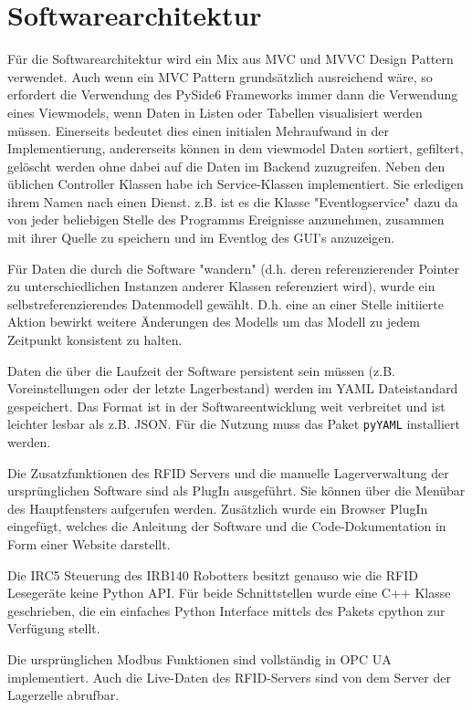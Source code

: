 \chapter{Softwarearchitektur}\label{Softwarearchitektur}

Für die Softwarearchitektur wird ein Mix aus MVC und MVVC Design Pattern verwendet. 
Auch wenn ein MVC Pattern grundsätzlich ausreichend wäre, so erfordert die Verwendung des PySide6 Frameworks immer 
dann die Verwendung eines Viewmodels, wenn Daten in Listen oder Tabellen visualisiert werden müssen. 
Einerseits bedeutet dies einen initialen Mehraufwand in der Implementierung, andererseits können in dem viewmodel 
Daten sortiert, gefiltert, gelöscht werden ohne dabei auf die Daten im Backend zuzugreifen. 
Neben den üblichen Controller Klassen habe ich Service-Klassen implementiert. Sie erledigen ihrem Namen nach einen Dienst. 
z.B. ist es die Klasse "Eventlogservice" dazu da von jeder beliebigen Stelle des Programms Ereignisse anzunehmen, zusammen mit ihrer 
Quelle zu speichern und im Eventlog des GUI's anzuzeigen. 

Für Daten die durch die Software "wandern" (d.h. deren referenzierender Pointer zu unterschiedlichen Instanzen anderer Klassen referenziert wird), 
wurde ein selbstreferenzierendes Datenmodell gewählt. D.h. eine an einer Stelle initiierte Aktion bewirkt weitere Änderungen des Modells um
das Modell zu jedem Zeitpunkt konsistent zu halten.

Daten die über die Laufzeit der Software persistent sein müssen (z.B. Voreinstellungen oder der letzte Lagerbestand) werden im YAML
Dateistandard gespeichert. Das Format ist in der Softwareentwicklung weit verbreitet und ist leichter lesbar als z.B. JSON. 
Für die Nutzung muss das Paket \verb|pyYAML| installiert werden.

Die Zusatzfunktionen des RFID Servers und die manuelle Lagerverwaltung der ursprünglichen Software sind als PlugIn ausgeführt. 
Sie können über die Menübar des Hauptfensters aufgerufen werden. Zusätzlich wurde ein Browser PlugIn eingefügt, welches die
Anleitung der Software und die Code-Dokumentation in Form einer Website darstellt. 

Die IRC5 Steuerung des IRB140 Robotters besitzt genauso wie die RFID Lesegeräte keine Python API. Für beide Schnittstellen wurde eine
C++ Klasse geschrieben, die ein einfaches Python Interface mittels des Pakets cpython zur Verfügung stellt. 

Die ursprünglichen Modbus Funktionen sind vollständig in OPC UA implementiert. 
Auch die Live-Daten des RFID-Servers sind von dem Server der Lagerzelle abrufbar. 

